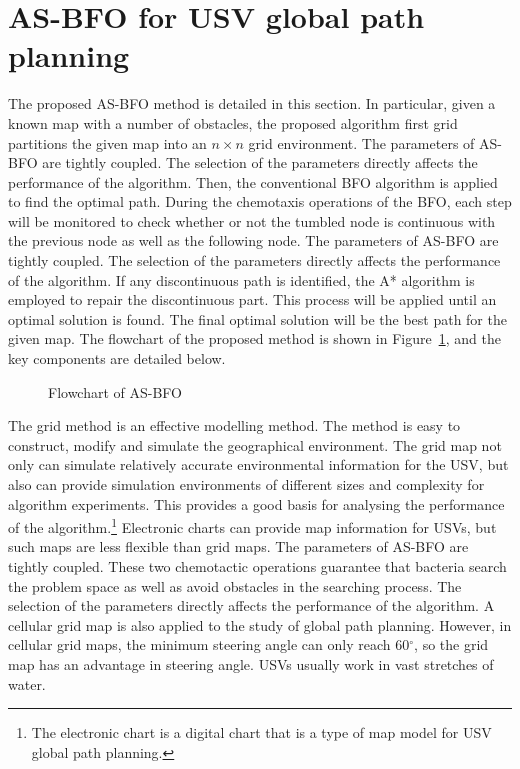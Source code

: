 \documentclass{PDS}%
\theoremstyle{definition}
\begin{document}
\section{AS-BFO for USV global path planning}\label{sec3}

The proposed AS-BFO method is detailed in this section. In particular, given a known map
with a number of obstacles, the proposed algorithm first grid partitions the given map into
an $n \times n$ grid environment. The parameters of AS-BFO are tightly coupled. The selection of the parameters
directly affects the performance of the algorithm. Then, the conventional BFO algorithm is applied to
find the optimal path. During the chemotaxis operations of the BFO, each step will be
monitored to check whether  or not  the tumbled node is continuous with the previous node as well
as the following node. The parameters of AS-BFO are tightly coupled. The selection of the parameters
directly affects the performance of the algorithm. If any discontinuous path is identified, the A*
algorithm is employed to repair the discontinuous part. This process will be applied
until an optimal solution is found. The final optimal solution will be the best path for the
given map. The flowchart of the proposed method is shown in Figure~\ref{fig:1}, and
the key components are detailed below.
\begin{figure}[h!]
\caption{Flowchart of AS-BFO}
\label{fig:1}
\end{figure}

The grid method is an effective modelling method. The method is easy to construct, modify
and simulate the geographical environment. The grid map not only can simulate relatively
accurate environmental information for the USV, but also can provide simulation environments of
different sizes and complexity for algorithm experiments. This provides a good basis for
analysing the performance of the algorithm.\footnote{The electronic chart is a digital chart that is a
type of map model for USV global path planning.} Electronic charts can provide map
information for USVs, but such maps are less flexible than grid maps. The parameters of AS-BFO are tightly coupled. These two chemotactic operations
guarantee that bacteria search the problem space as well as avoid obstacles in the
searching process. The selection of the parameters
directly affects the performance of the algorithm. A cellular grid map
is also applied to the study of global path planning. However, in cellular grid maps, the
minimum steering angle can only reach 60$^{\circ}$, so the grid map has an advantage in
steering angle. USVs usually work in vast stretches of water.
\end{document}
